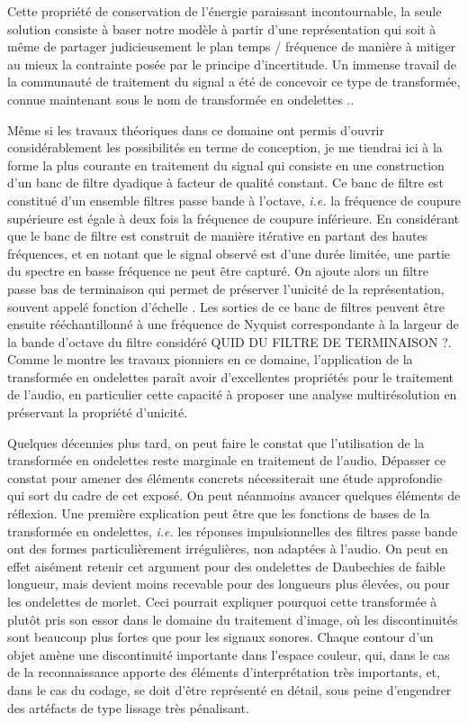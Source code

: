 Cette propriété de conservation de l'énergie paraissant incontournable, la seule solution consiste à baser notre modèle à partir d'une représentation qui soit à même de partager judicieusement le plan temps / fréquence de manière à mitiger au mieux la contrainte posée par le principe d'incertitude. Un immense travail de la communauté de traitement du signal a été de concevoir ce type de transformée, connue maintenant sous le nom de transformée en \og ondelettes \fg.\cite{mallat1989theory}.

Même si les travaux théoriques dans ce domaine ont permis d'ouvrir considérablement les possibilités en terme de conception, je me  tiendrai ici à la forme la plus courante en traitement du signal qui consiste en une construction d'un banc de filtre dyadique à facteur de qualité constant. Ce banc de filtre est constitué d'un ensemble filtres passe bande à l'octave, \textit{i.e.} la fréquence de coupure supérieure est égale à deux fois la fréquence de coupure inférieure. En considérant que le banc de filtre est construit de manière itérative en partant des hautes fréquences, et en notant que le signal observé est d'une durée limitée, une partie du spectre en basse fréquence ne peut être capturé. On ajoute alors un filtre passe bas \og de terminaison \fg qui permet de préserver l'unicité de la représentation, souvent appelé \og fonction d'échelle \fg. Les sorties de ce banc de filtres peuvent être ensuite rééchantillonné à une fréquence de Nyquist correspondante à la largeur de la bande d'octave du filtre considéré QUID DU FILTRE DE TERMINAISON ?. Comme le montre les travaux pionniers en ce domaine\cite{kronland1987analysis}, l'application de la transformée en ondelettes paraît avoir d'excellentes propriétés pour le traitement de l'audio, en particulier cette capacité à proposer une analyse multirésolution en préservant la propriété d'unicité.

Quelques décennies plus tard, on peut faire le constat que l'utilisation de la transformée en ondelettes reste marginale en traitement de l'audio. Dépasser ce constat pour amener des éléments concrets nécessiterait une étude approfondie qui sort du cadre de cet exposé. On peut néanmoins avancer quelques éléments de réflexion. Une première explication peut être que les fonctions de bases de la transformée en ondelettes, \textit{i.e.} les réponses impulsionnelles des filtres passe bande ont des formes particulièrement irrégulières, non adaptées à l'audio. On peut en effet aisément retenir cet argument pour des ondelettes de Daubechies de faible longueur, mais devient moins recevable pour des longueurs plus élevées, ou pour les ondelettes de morlet. Ceci pourrait expliquer pourquoi cette transformée à plutôt pris son essor dans le domaine du traitement d'image, où les discontinuités sont beaucoup plus fortes que pour les signaux sonores. Chaque contour d'un objet amène une discontinuité importante dans l'espace couleur, qui, dans le cas de la reconnaissance apporte des éléments d'interprétation très importants, et, dans le cas du codage, se doit d'être représenté en détail, sous peine d'engendrer des artéfacts de type \og lissage \fg très pénalisant.

